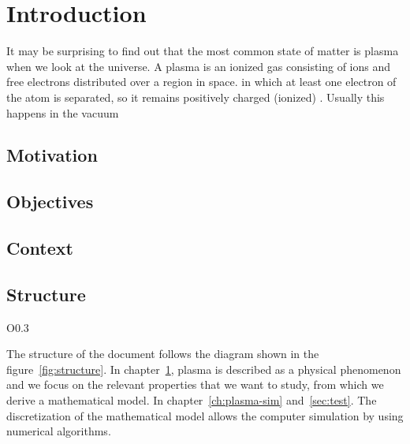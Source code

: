 \chapter{Introduction}
\label{ch:intro}

It may be surprising to find out that the most common state of matter is plasma 
when we look at the universe. A plasma is an ionized gas consisting of ions and
free electrons distributed over a region in space.
in which at least one electron 
of the atom is separated, so it remains positively charged (ionized) 
\cite{chen}.  Usually this happens in the vacuum

\section{Motivation}


\section{Objectives}

\section{Context}

\section{Structure}
%
\begin{wrapfigure}{O}{0.3\textwidth}
\centering
\scalebox{0.7} {
}
\caption{Principal steps in computer experiment}
\label{fig:structure}
\end{wrapfigure}
%
The structure of the document follows the diagram shown in the 
figure~\ref{fig:structure}. In chapter~\ref{ch:intro}, plasma is described as a 
physical phenomenon and we focus on the relevant properties that we want to 
study, from which we derive a mathematical model.  In 
chapter~\ref{ch:plasma-sim} and~\ref{sec:test}. The discretization of the 
mathematical model allows the computer simulation by using numerical algorithms.

